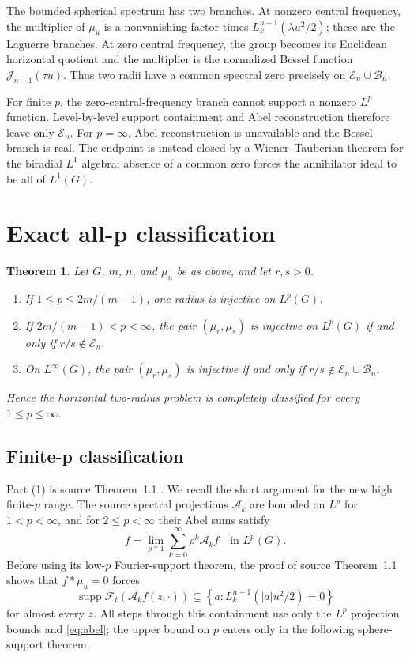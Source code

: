 \documentclass[11pt]{article}
\newtheorem{theorem}{Theorem}
\newcommand{\E}{\mathcal{E}}
\newcommand{\B}{\mathcal{B}}
\newcommand{\A}{\mathcal{A}}
\newcommand{\J}{\mathscr{J}}
\begin{document}
The bounded spherical spectrum has two branches.  At nonzero central
frequency, the multiplier of $\mu_u$ is a nonvanishing factor times
$L_k^{n-1}(\lambda u^2/2)$; these are the Laguerre branches.  At zero
central frequency, the group becomes its Euclidean horizontal quotient and
the multiplier is the normalized Bessel function $\J_{n-1}(\tau u)$.
Thus two radii have a common spectral zero precisely on $\E_n\cup\B_n$.

For finite $p$, the zero-central-frequency branch cannot support a nonzero
$L^p$ function.  Level-by-level support containment and Abel reconstruction
therefore leave only $\E_n$.  For $p=\infty$, Abel reconstruction is
unavailable and the Bessel branch is real.  The endpoint is instead closed
by a Wiener--Tauberian theorem for the biradial $L^1$ algebra: absence of a
common zero forces the annihilator ideal to be all of $L^1(G)$.

\section{Exact all-p classification}

\begin{theorem}\label{thm:main}
Let $G$, $m$, $n$, and $\mu_u$ be as above, and let $r,s>0$.
\begin{enumerate}
\item If $1\leq p\leq2m/(m-1)$, one radius is injective on $L^p(G)$.
\item If $2m/(m-1)<p<\infty$, the pair $(\mu_r,\mu_s)$ is injective on
      $L^p(G)$ if and only if $r/s\notin\E_n$.
\item On $L^\infty(G)$, the pair $(\mu_r,\mu_s)$ is injective if and only
      if $r/s\notin\E_n\cup\B_n$.
\end{enumerate}
Hence the horizontal two-radius problem is completely classified for every
$1\leq p\leq\infty$.
\end{theorem}

\subsection{Finite-p classification}

Part (1) is source Theorem~1.1 \cite{NSY}.  We recall the short argument for
the new high finite-$p$ range.  The source spectral projections $\A_k$ are
bounded on $L^p$ for $1<p<\infty$, and for $2\leq p<\infty$ their Abel sums
satisfy
\begin{equation}\label{eq:abel}
 f=\lim_{\rho\uparrow1}\sum_{k=0}^\infty\rho^k\A_kf
 \quad\text{in }L^p(G).
\end{equation}
Before using its low-$p$ Fourier-support theorem, the proof of source
Theorem~1.1 shows that $f*\mu_u=0$ forces
\[
 \operatorname{supp}\mathcal F_t(\A_kf(z,\cdot))
 \subseteq\left\{a:L_k^{n-1}(|a|u^2/2)=0\right\}
\]
for almost every $z$.  All steps through this containment use only the
$L^p$ projection bounds and \eqref{eq:abel}; the upper bound on $p$ enters
only in the following sphere-support theorem.
\end{document}
